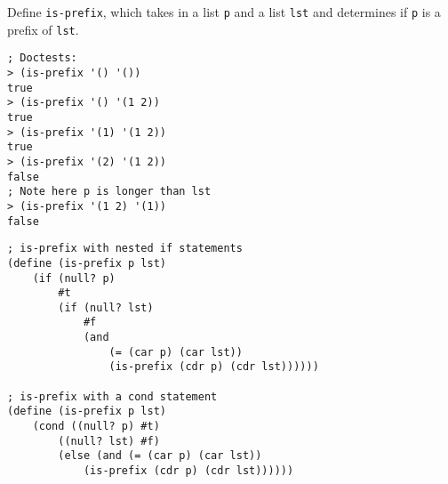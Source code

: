 \begin{blocksection}
\question Define \lstinline$is-prefix$, which takes in a list \lstinline$p$ and a list \lstinline$lst$ and determines if \lstinline$p$ is a prefix of \lstinline$lst$.

\begin{lstlisting}
; Doctests:
> (is-prefix '() '())
true
> (is-prefix '() '(1 2))
true
> (is-prefix '(1) '(1 2))
true
> (is-prefix '(2) '(1 2))
false
; Note here p is longer than lst
> (is-prefix '(1 2) '(1))
false
\end{lstlisting}

\begin{solution}[1.5in]
\begin{lstlisting}
; is-prefix with nested if statements
(define (is-prefix p lst)
    (if (null? p)
        #t
        (if (null? lst)
            #f
            (and
                (= (car p) (car lst))
                (is-prefix (cdr p) (cdr lst))))))

; is-prefix with a cond statement
(define (is-prefix p lst)
    (cond ((null? p) #t)
        ((null? lst) #f)
        (else (and (= (car p) (car lst))
            (is-prefix (cdr p) (cdr lst))))))
 
\end{lstlisting}
\end{solution}
\end{blocksection}
